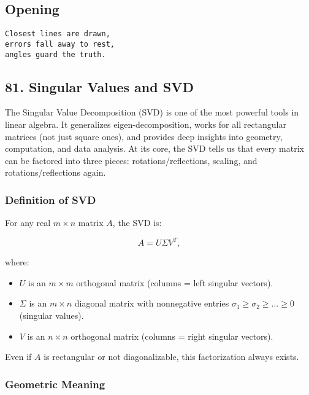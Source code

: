 \documentclass[
  letterpaper,
  DIV=11,
  numbers=noendperiod]{scrreprt}
\providecommand{\tightlist}{%
  \setlength{\itemsep}{0pt}\setlength{\parskip}{0pt}}
\begin{document}
\subsection{Opening}\label{opening-7}

\begin{verbatim}
Closest lines are drawn,
errors fall away to rest,
angles guard the truth.
\end{verbatim}

\subsection{81. Singular Values and SVD}\label{singular-values-and-svd}

The Singular Value Decomposition (SVD) is one of the most powerful tools
in linear algebra. It generalizes eigen-decomposition, works for all
rectangular matrices (not just square ones), and provides deep insights
into geometry, computation, and data analysis. At its core, the SVD
tells us that every matrix can be factored into three pieces:
rotations/reflections, scaling, and rotations/reflections again.

\subsubsection{Definition of SVD}\label{definition-of-svd}

For any real \(m \times n\) matrix \(A\), the SVD is:

\[
A = U \Sigma V^T,
\]

where:

\begin{itemize}
\tightlist
\item
  \(U\) is an \(m \times m\) orthogonal matrix (columns = left singular
  vectors).
\item
  \(\Sigma\) is an \(m \times n\) diagonal matrix with nonnegative
  entries \(\sigma_1 \geq \sigma_2 \geq \dots \geq 0\) (singular
  values).
\item
  \(V\) is an \(n \times n\) orthogonal matrix (columns = right singular
  vectors).
\end{itemize}

Even if \(A\) is rectangular or not diagonalizable, this factorization
always exists.

\subsubsection{Geometric Meaning}\label{geometric-meaning-25}
\end{document}

